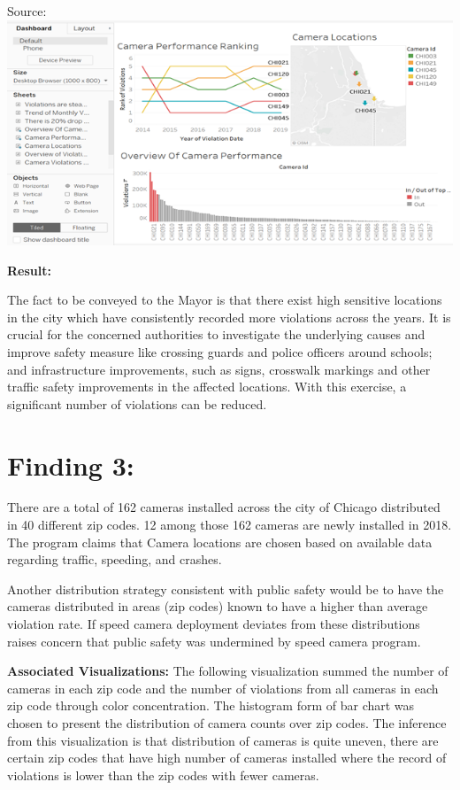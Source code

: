 \documentclass[]{book}
\begin{document}
Source:\citep{tableau}
\includegraphics{images/Image8.png}

\textbf{Result:}

The fact to be conveyed to the Mayor is that there exist high sensitive locations in the city which have consistently recorded more violations across the years. It is crucial for the concerned authorities to investigate the underlying causes and improve safety measure like crossing guards and police officers around schools; and infrastructure improvements, such as signs, crosswalk markings and other traffic safety improvements in the affected locations. With this exercise, a significant number of violations can be reduced.

\hypertarget{finding-3}{%
\section{Finding 3:}\label{finding-3}}

There are a total of 162 cameras installed across the city of Chicago distributed in 40 different zip codes. 12 among those 162 cameras are newly installed in 2018.\citep{cameradetails} The program claims that Camera locations are chosen based on available data regarding traffic, speeding, and crashes.

Another distribution strategy consistent with public safety would be to have the cameras distributed in areas (zip codes) known to have a higher than average violation rate. If speed camera deployment deviates from these distributions raises concern that public safety was undermined by speed camera program.

\textbf{Associated Visualizations:}
The following visualization summed the number of cameras in each zip code and the number of violations from all cameras in each zip code through color concentration. The histogram form of bar chart was chosen to present the distribution of camera counts over zip codes. The inference from this visualization is that distribution of cameras is quite uneven, there are certain zip codes that have high number of cameras installed where the record of violations is lower than the zip codes with fewer cameras.
\end{document}
